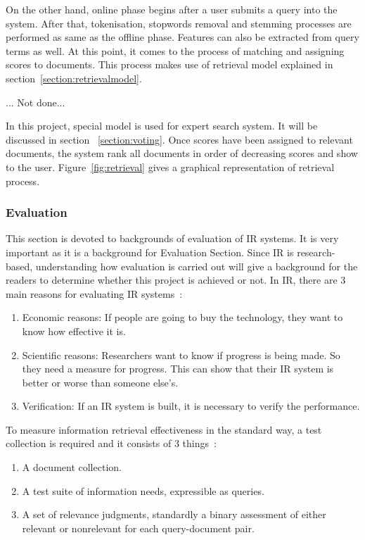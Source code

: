 On the other hand, online phase begins after a user submits a query into the system. After that, tokenisation, stopwords removal and stemming processes 
are performed as same as the offline phase.
Features can also be extracted from query terms as well. At this point, it comes to the process of matching and assigning scores to documents.
This process makes use of retrieval model explained in section~\ref{section:retrievalmodel}.


... Not done... 


In this project, special model is used for expert search system. It will be discussed
in section ~\ref{section:voting}. Once scores have been assigned to relevant documents, the system rank all documents in order of decreasing scores and 
show to the user. Figure~\ref{fig:retrieval} gives a graphical representation of retrieval process.

\subsubsection{Evaluation}\label{sec:evaluation}
This section is devoted to backgrounds of evaluation of IR systems. It is very important as it is a background for Evaluation Section. 
Since IR is research-based, understanding how evaluation is carried out will give a background for the readers to determine whether 
this project is achieved or not. In IR, there are 3 main reasons for evaluating IR systems~\cite[P. 3]{eval}: 
\begin{enumerate}
 \item Economic reasons: If people are going to buy the technology, they want to know how effective it is.
 \item Scientific reasons: Researchers want to know if progress is being made. So they need a measure for progress. 
	This can show that their IR system is better or worse than someone else's.
 \item Verification: If an IR system is built, it is necessary to verify the performance.
\end{enumerate}

To measure information retrieval effectiveness in the standard way, a test collection is required and it consists of 3 things~\cite{evalweb}:
\begin{enumerate}
 \item A document collection.
 \item A test suite of information needs, expressible as queries.
 \item A set of relevance judgments, standardly a binary assessment of either relevant or nonrelevant for each query-document pair.
\end{enumerate}


